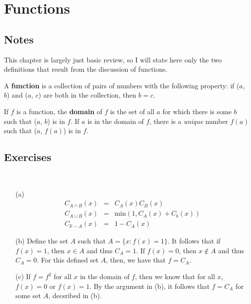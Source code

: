 \section{Functions}

\subsection{Notes}
This chapter is largely just basic review, so I will state here only the two definitions that result from the discussion of functions.

\begin{definition}
A \textbf{function} is a collection of pairs of numbers with the following property: if ($a$, $b$) and ($a$, $c$) are both in the collection, then $b = c$.
\end {definition}

\begin{definition}
If $f$ is a function, the \textbf{domain} of $f$ is the set of all $a$ for which there is some $b$ such that ($a$, $b$) is in $f$. If $a$ is in the domain of $f$, there is a \textit{unique} number $f(a)$ such that ($a$, $f(a)$) is in $f$.
\end{definition}

\subsection{Exercises}
\begin{problem}[3-9] \ 
\begin{enumerate}

\item[(a)] 
\begin{eqnarray*}
C_{A \cap B}(x)     & = & C_A(x) C_B(x) \\
C_{A \cup B}(x)     & = & \textrm{min}(1, C_A(x) + C_b(x)) \\
C_{\mathbb{R} - A}(x) & = & 1 - C_A(x)
\end{eqnarray*}

\item[(b)]
Define the set $A$ such that $A = \{x: f(x) = 1\}$. It follows that if $f(x) = 1$, then $x \in A$ and thus $C_A = 1$. If $f(x) = 0$, then $x \not\in A$ and thus $C_A = 0$. For this defined set $A$, then, we have that $f = C_A$.

\item[(c)]
If $f = f^2$ for all $x$ in the domain of $f$, then we know that for all $x$, $f(x) = 0$ or $f(x) = 1$. By the argument in (b), it follows that $f = C_A$ for some set $A$, decsribed in (b).  

\end{enumerate}
\end{problem}

